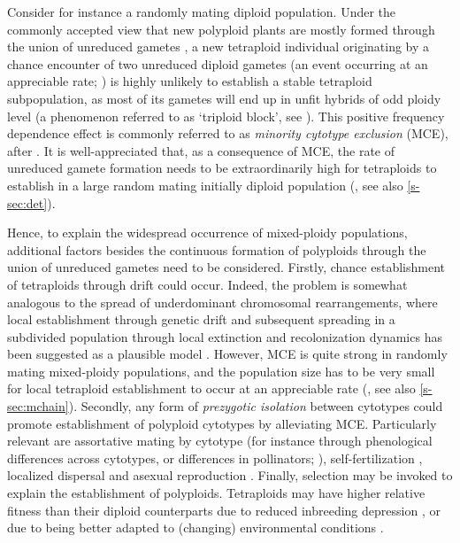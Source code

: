 \documentclass[12pt,a4paper]{article}
\begin{document}
Consider for instance a randomly mating diploid population.
Under the commonly accepted view that new polyploid plants are mostly formed
through the union of unreduced gametes
\citep{bretagnolle1995,herben2016,kreiner2017b}, a new tetraploid individual
originating by a chance encounter of two unreduced diploid gametes (an event
occurring at an appreciable rate; \cite{kreiner2017}) is highly unlikely to
establish a stable tetraploid subpopulation, as most of its gametes will end up
in unfit hybrids of odd ploidy level (a phenomenon referred to as `triploid
block', see \cite{ramsey1998,kohler2010,brown2024}).
This positive frequency dependence effect is commonly referred to as
\textit{minority cytotype exclusion} (MCE), after \cite{levin1975}.
It is well-appreciated that, as a consequence of MCE, the rate of unreduced
gamete formation needs to be extraordinarily high for tetraploids to establish
in a large random mating initially diploid population (\cite{felber1997}, see
also \cref{s-sec:det}).

Hence, to explain the widespread occurrence of mixed-ploidy populations,
additional factors besides the continuous formation of polyploids through the
union of unreduced gametes need to be considered.
Firstly, chance establishment of tetraploids through drift could occur.
Indeed, the problem is somewhat analogous to the spread of underdominant
chromosomal rearrangements, where local establishment through genetic drift and
subsequent spreading in a subdivided population through local extinction and 
recolonization dynamics has been suggested as a plausible model
\citep{lande1985}.
However, MCE is quite strong in randomly mating mixed-ploidy populations, and
the population size has to be very small for local tetraploid establishment to
occur at an appreciable rate (\cite{rausch2005}, see also \cref{s-sec:mchain}).
Secondly, any form of \textit{prezygotic isolation} between cytotypes could
promote establishment of polyploid cytotypes by alleviating MCE.
Particularly relevant are assortative mating by cytotype  (for instance through
phenological differences across cytotypes, or differences in pollinators;
\cite{kolar2017}), self-fertilization \citep{rausch2005,novikova2023}, 
localized dispersal \citep{baack2005,kolar2017} and asexual reproduction
\citep{vandrunen2022}.
Finally, selection may be invoked to explain the establishment of polyploids.
Tetraploids may have higher relative fitness than their diploid counterparts
due to reduced inbreeding depression
\citep{ronfort1999,otto2000,husband2008,clo2022b}, or due to being
better adapted to (changing) environmental conditions \citep{vandepeer2021}. 
\end{document}
